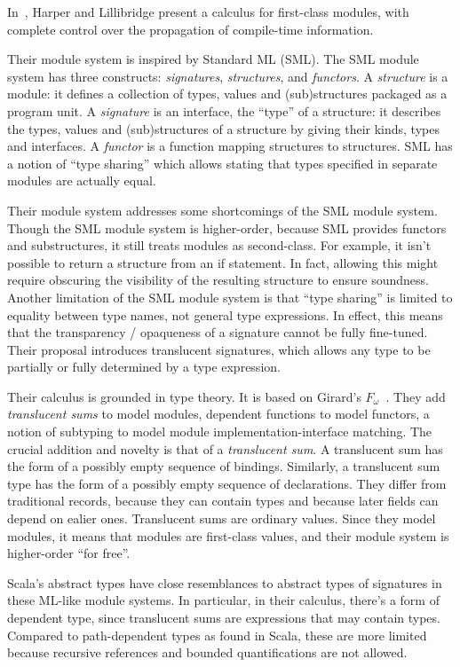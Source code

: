 \documentclass[10pt,journal,a4paper]{IEEEtran}
\begin{document}
In~\cite{homl}, Harper and Lillibridge present a calculus for
first-class modules, with complete control over the propagation of
compile-time information.

Their module system is inspired by Standard ML (SML). The SML module
system has three constructs: {\it signatures}, {\it structures}, and
{\it functors}. A {\it structure} is a module: it defines a collection
of types, values and (sub)structures packaged as a program unit. A
{\it signature} is an interface, the ``type'' of a structure: it
describes the types, values and (sub)structures of a structure by
giving their kinds, types and interfaces. A {\it functor} is a
function mapping structures to structures. SML has a notion of ``type
sharing'' which allows stating that types specified in separate
modules are actually equal.

Their module system addresses some shortcomings of the SML module
system. Though the SML module system is higher-order, because SML
provides functors and substructures, it still treats modules as
second-class. For example, it isn't possible to return a structure
from an if statement. In fact, allowing this might require obscuring
the visibility of the resulting structure to ensure soundness. Another
limitation of the SML module system is that ``type sharing'' is
limited to equality between type names, not general type
expressions. In effect, this means that the transparency / opaqueness
of a signature cannot be fully fine-tuned. Their proposal introduces
translucent signatures, which allows any type to be partially or fully
determined by a type expression.

Their calculus is grounded in type theory. It is based on Girard's
$F_\omega$~\cite{tapl}. They add {\it translucent sums} to model
modules, dependent functions to model functors, a notion of subtyping
to model module implementation-interface matching. The crucial
addition and novelty is that of a {\it translucent sum}. A translucent
sum has the form of a possibly empty sequence of bindings. Similarly,
a translucent sum type has the form of a possibly empty sequence of
declarations. They differ from traditional records, because they can
contain types and because later fields can depend on ealier
ones. Translucent sums are ordinary values. Since they model modules,
it means that modules are first-class values, and their module system
is higher-order ``for free''.

Scala's abstract types have close resemblances to abstract types of
signatures in these ML-like module systems. In particular, in their
calculus, there's a form of dependent type, since translucent sums are
expressions that may contain types. Compared to path-dependent types
as found in Scala, these are more limited because recursive references
and bounded quantifications are not allowed.
\end{document}
